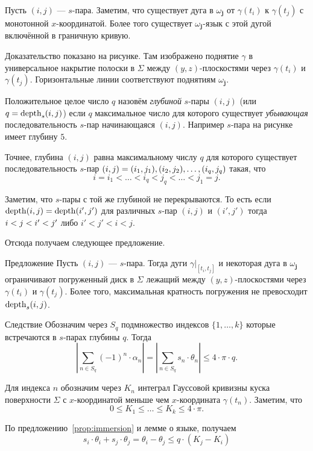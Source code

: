 \documentclass[a4paper,10pt]{article}
\begin{document}
Пусть $(i,j)$ --- $s$-пара.
Заметим, что существует дуга в $\omega_{\bm{j}}$ от $\gamma(t_i)$ к $\gamma(t_j)$
с монотонной $x$-координатой.
Более того существует $\omega_{\bm{j}}$-язык с этой дугой включённой в граничную кривую.

Доказательство показано на рисунке.
Там изображено поднятие $\gamma$ в универсальное накрытие полоски в $\Sigma$ между $(y,z)$-плоскостями через $\gamma(t_i)$ и $\gamma(t_j)$.
Горизонтальные линии соответствуют поднятиям $\omega_{\bm{j}}$.

Положительное целое число $q$
назовём \emph{глубиной} $s$-пары $(i,j)$ 
(или $q\zz=\depth_{s}(i,j)$) 
если $q$ максимальное число для которого существует \emph{убывающая} последовательность $s$-пар начинающаяся $(i,j)$.
Например $s$-пара на рисунке имеет глубину $5$.

Точнее, глубина $(i,j)$ равна максимальному числу $q$
для которого существует последовательность $s$-пар
$(i,j)=(i_1,j_1),(i_2,j_2),\zz\dots,(i_q,j_q)$ такая, что
\[i=i_1<\dots<i_q<j_q<\dots<j_1=j.\]


Заметим, что $s$-пары с той же глубиной не перекрываются.
То есть если $\mathop{\rm depth}\nolimits(i,j)=\mathop{\rm depth}\nolimits(i',j')$
для различных $s$-пар $(i,j)$ и $(i',j')$
тогда $i\zz<j\zz<i'\zz<j'$ либо $i'<j'<i<j$.

Отсюда получаем следующее предложение.

\begin{thm}{Предложение}\label{prop:immersion}
Пусть $(i,j)$ --- $s$-пара.
Тогда дуги $\gamma|_{[t_i,t_j]}$ и некоторая дуга в $\omega_{\bm{j}}$ ограничивают погруженный диск в $\Sigma$ лежащий между $(y,z)$-плоскостями через $\gamma(t_i)$ и $\gamma(t_j)$.
Более того, максимальная кратность погружения не превосходит $\mathop{\rm depth}\nolimits_{s}(i,j)$.
\end{thm}


\begin{thm}{Следствие}\label{cor:Sq}
Обозначим через $S_q$ подмножество индексов $\{1,\dots,k\}$
которые встречаются в $s$-парах глубины $q$.
Тогда
\[\left|\sum_{n\in S_q}(-1)^n\cdot\alpha_n\right|
=\left|\sum_{n\in S_q}s_n\cdot\theta_n\right|
\le 4\cdot\pi\cdot q.\]
\end{thm}

 Для индекса $n$ обозначим через $K_n$ интеграл Гауссовой кривизны куска поверхности $\Sigma$ с $x$-координатой меньше чем $x$-координата $\gamma(t_n)$.
Заметим, что
\[0\le K_1\le\dots\le K_k\le 4\cdot\pi.\]


По предложению~\ref{prop:immersion} и лемме о языке, получаем
\[s_i\cdot\theta_i+s_j\cdot\theta_j=\theta_i-\theta_j\le q\cdot (K_j-K_i)\]
\end{document}
